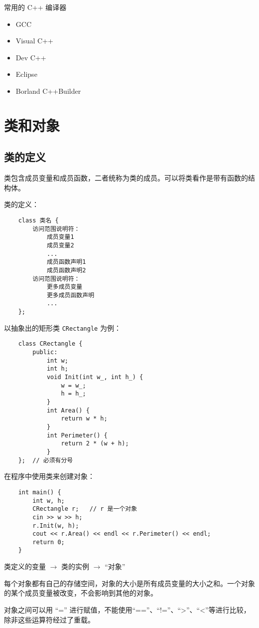 \documentclass[UTF8]{ctexart}
\begin{document}
常用的 C++ 编译器
\begin{itemize}
    \item GCC
    \item Visual C++
    \item Dev C++
    \item Eclipse
    \item Borland C++Builder
\end{itemize}

\section{类和对象}
\subsection{类的定义}
类包含成员变量和成员函数，二者统称为类的成员。可以将类看作是带有函数的结构体。

类的定义：
\begin{verbatim}
    class 类名 {
        访问范围说明符：
            成员变量1
            成员变量2
            ...
            成员函数声明1
            成员函数声明2
        访问范围说明符：
            更多成员变量
            更多成员函数声明
            ...
    };
\end{verbatim}

以抽象出的矩形类 \texttt{CRectangle} 为例：
\begin{verbatim}
    class CRectangle {
        public:
            int w;
            int h;
            void Init(int w_, int h_) {
                w = w_;
                h = h_;
            }
            int Area() {
                return w * h;
            }
            int Perimeter() {
                return 2 * (w + h);
            }
    };  // 必须有分号
\end{verbatim}

在程序中使用类来创建对象：
\begin{verbatim}
    int main() {
        int w, h;
        CRectangle r;   // r 是一个对象
        cin >> w >> h;
        r.Init(w, h);
        cout << r.Area() << endl << r.Perimeter() << endl;
        return 0;
    }
\end{verbatim}

类定义的变量 $\rightarrow$ 类的实例 $\rightarrow$ “对象”

每个对象都有自己的存储空间，对象的大小是所有成员变量的大小之和。一个对象的某个成员变量被改变，不会影响到其他的对象。

对象之间可以用 “=” 进行赋值，不能使用“==”、“!=”、“>”、“<”等进行比较，除非这些运算符经过了重载。
\end{document}
